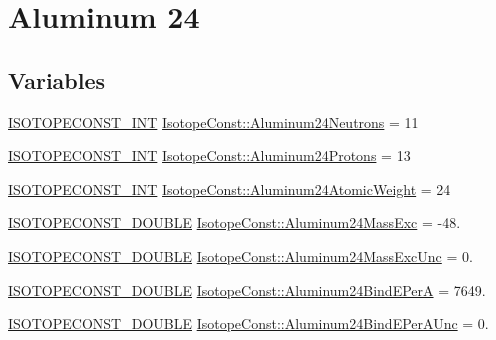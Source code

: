 \hypertarget{group___isotope_const-_aluminum-_al24}{}\section{Aluminum 24}
\label{group___isotope_const-_aluminum-_al24}
\subsection*{Variables}
\begin{DoxyCompactItemize}
\item 
\mbox{\hyperlink{group___isotope_const-_macros_ga5f18360b3e99483a35c32d789e62621c}{I\+S\+O\+T\+O\+P\+E\+C\+O\+N\+S\+T\+\_\+\+I\+NT}} \mbox{\hyperlink{group___isotope_const-_aluminum-_al24_ga7f2fe0ffbcb0fd95f069a066ea002090}{Isotope\+Const\+::\+Aluminum24\+Neutrons}} = 11
\item 
\mbox{\hyperlink{group___isotope_const-_macros_ga5f18360b3e99483a35c32d789e62621c}{I\+S\+O\+T\+O\+P\+E\+C\+O\+N\+S\+T\+\_\+\+I\+NT}} \mbox{\hyperlink{group___isotope_const-_aluminum-_al24_gac3582db5a6b7a5608ee611e9affee90b}{Isotope\+Const\+::\+Aluminum24\+Protons}} = 13
\item 
\mbox{\hyperlink{group___isotope_const-_macros_ga5f18360b3e99483a35c32d789e62621c}{I\+S\+O\+T\+O\+P\+E\+C\+O\+N\+S\+T\+\_\+\+I\+NT}} \mbox{\hyperlink{group___isotope_const-_aluminum-_al24_gab7752d2a60514c9108b22b97e7379624}{Isotope\+Const\+::\+Aluminum24\+Atomic\+Weight}} = 24
\item 
\mbox{\hyperlink{group___isotope_const-_macros_ga8f45a7272ce02c0b4c65c44636ed719a}{I\+S\+O\+T\+O\+P\+E\+C\+O\+N\+S\+T\+\_\+\+D\+O\+U\+B\+LE}} \mbox{\hyperlink{group___isotope_const-_aluminum-_al24_gad2b37d71345ce8f2ff16771efb6df5b9}{Isotope\+Const\+::\+Aluminum24\+Mass\+Exc}} = -\/48.
\item 
\mbox{\hyperlink{group___isotope_const-_macros_ga8f45a7272ce02c0b4c65c44636ed719a}{I\+S\+O\+T\+O\+P\+E\+C\+O\+N\+S\+T\+\_\+\+D\+O\+U\+B\+LE}} \mbox{\hyperlink{group___isotope_const-_aluminum-_al24_ga517869d87dd5139208cc9693c9b0df89}{Isotope\+Const\+::\+Aluminum24\+Mass\+Exc\+Unc}} = 0.
\item 
\mbox{\hyperlink{group___isotope_const-_macros_ga8f45a7272ce02c0b4c65c44636ed719a}{I\+S\+O\+T\+O\+P\+E\+C\+O\+N\+S\+T\+\_\+\+D\+O\+U\+B\+LE}} \mbox{\hyperlink{group___isotope_const-_aluminum-_al24_gaa10c9022199938eeff68fc99c31e6b08}{Isotope\+Const\+::\+Aluminum24\+Bind\+E\+PerA}} = 7649.
\item 
\mbox{\hyperlink{group___isotope_const-_macros_ga8f45a7272ce02c0b4c65c44636ed719a}{I\+S\+O\+T\+O\+P\+E\+C\+O\+N\+S\+T\+\_\+\+D\+O\+U\+B\+LE}} \mbox{\hyperlink{group___isotope_const-_aluminum-_al24_ga897d3946e8622f4e8276c0bb9daeccd8}{Isotope\+Const\+::\+Aluminum24\+Bind\+E\+Per\+A\+Unc}} = 0.

\end{DoxyCompactItemize}
